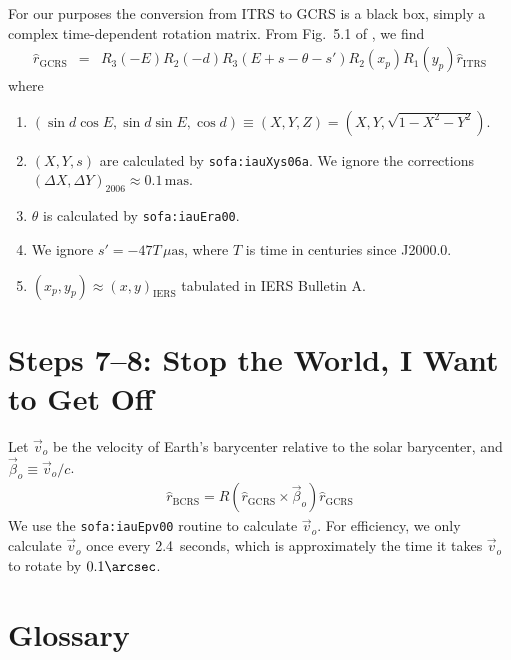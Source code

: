\documentclass[10pt,preprint]{aastex}
\newcommand{\ITRS}{\mathrm{ITRS}}
\newcommand{\GCRS}{\mathrm{GCRS}}
\newcommand{\IERS}{\mathrm{IERS}}
\newcommand{\rhat}{{\hat r}}
\newcommand{\rgcrs}{{\hat r}_\mathrm{GCRS}}
\newcommand{\rbcrs}{{\hat r}_\mathrm{BCRS}}
\begin{document}
For our purposes the conversion from ITRS to GCRS is a black box, simply a complex time-dependent rotation matrix.
From Fig.~5.1 of \cite{iers2010}, we find
\begin{eqnarray}
\rhat_\GCRS &=& R_3(-E) R_2(-d) R_3(E + s - \theta - s')R_2(x_p)R_1(y_p) \rhat_\ITRS
\end{eqnarray}
where
\begin{enumerate}
\item $(\sin d \cos E, \sin d \sin E, \cos d) \equiv (X,Y,Z)
= (X,Y,\sqrt{1 - X^2 - Y^2})$.
\item $(X,Y,s)$ are calculated by \texttt{sofa:iauXys06a}.
We ignore the corrections $(\Delta X,\Delta Y)_{2006} \approx 0.1\,\mathrm{mas}$.
\item $\theta$ is calculated by \texttt{sofa:iauEra00}.
\item We ignore $s' = -47T\,\mu\mathrm{as}$, where $T$ is time in centuries since J2000.0.
\item $(x_p,y_p) \approx (x,y)_\IERS$ tabulated in IERS Bulletin A.
\end{enumerate}

\section{Steps 7--8: Stop the World, I Want to Get Off}

Let $\vec v_o$ be the velocity of Earth's barycenter relative to the solar barycenter, and $\vec\beta_o\equiv\vec v_o/c$.
\begin{eqnarray}
\rbcrs = R(\rgcrs\times\vec\beta_o) \rgcrs
\end{eqnarray}
We use the \texttt{sofa:iauEpv00} routine to calculate $\vec v_o$.
For efficiency, we only calculate $\vec v_o$ once every 2.4~seconds, which is approximately the time
it takes $\vec v_o$ to rotate by $0.1\arcsec$.

\nocite{*}

\appendix

\section{Glossary}
\end{document}
